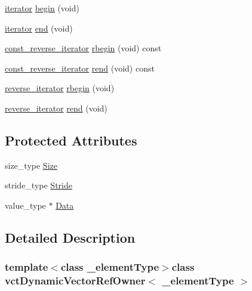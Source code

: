 \begin{DoxyCompactItemize}
\item 
\hyperlink{classvct_dynamic_vector_ref_owner_aaee0b96d24843f333909f2aba3aad782}{iterator} \hyperlink{classvct_dynamic_vector_ref_owner_ad4b80f3d8cfb7143b641fc2f013979c2}{begin} (void)
\item 
\hyperlink{classvct_dynamic_vector_ref_owner_aaee0b96d24843f333909f2aba3aad782}{iterator} \hyperlink{classvct_dynamic_vector_ref_owner_a0bfdd158120e2a16af78d71a2396ea63}{end} (void)
\item 
\hyperlink{classvct_dynamic_vector_ref_owner_a9ab3900ecbd8f4d4eb4615a2c9a972a3}{const\-\_\-reverse\-\_\-iterator} \hyperlink{classvct_dynamic_vector_ref_owner_aaad2fd994d1571470179b8e12672bcaf}{rbegin} (void) const 
\item 
\hyperlink{classvct_dynamic_vector_ref_owner_a9ab3900ecbd8f4d4eb4615a2c9a972a3}{const\-\_\-reverse\-\_\-iterator} \hyperlink{classvct_dynamic_vector_ref_owner_a68b96753d2c8a7ef3cbe51d6e827cbee}{rend} (void) const 
\item 
\hyperlink{classvct_dynamic_vector_ref_owner_a3949acd3baa131459d464b058d249990}{reverse\-\_\-iterator} \hyperlink{classvct_dynamic_vector_ref_owner_ac6aed949da243790178097926f02eae2}{rbegin} (void)
\item 
\hyperlink{classvct_dynamic_vector_ref_owner_a3949acd3baa131459d464b058d249990}{reverse\-\_\-iterator} \hyperlink{classvct_dynamic_vector_ref_owner_ad6b48611d5e7d5ff74cde4f6a521aa91}{rend} (void)
\end{DoxyCompactItemize}
\subsection*{Protected Attributes}
\begin{DoxyCompactItemize}
\item 
size\-\_\-type \hyperlink{classvct_dynamic_vector_ref_owner_ab2a6a1ca285d5c64b4e39f6f33d1794d}{Size}
\item 
stride\-\_\-type \hyperlink{classvct_dynamic_vector_ref_owner_ae346c9cef9e023214e0286791fedae25}{Stride}
\item 
value\-\_\-type $\ast$ \hyperlink{classvct_dynamic_vector_ref_owner_a50664ce25ed6de8628998b3223998515}{Data}
\end{DoxyCompactItemize}


\subsection{Detailed Description}
\subsubsection*{template$<$class \-\_\-element\-Type$>$class vct\-Dynamic\-Vector\-Ref\-Owner$<$ \-\_\-element\-Type $>$}

